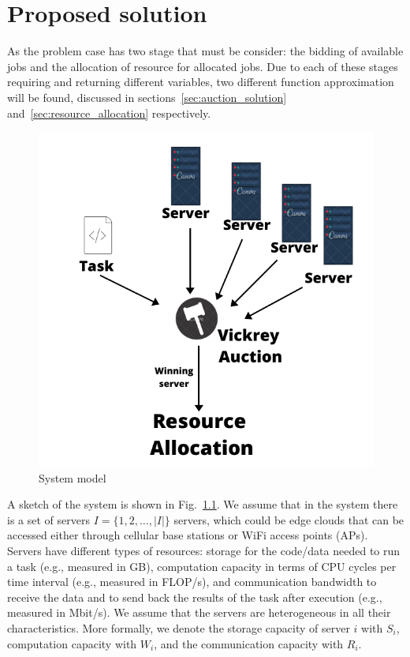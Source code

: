 \documentclass[sotoncolour]{uosproject}     %
\begin{document}
\chapter{Proposed solution}\label{ch:proposed_solution}
As the problem case has two stage that must be consider: the bidding of available jobs and the allocation of resource
for allocated jobs. Due to each of these stages requiring and returning different variables, two different function
approximation will be found, discussed in sections~\ref{sec:auction_solution} and~\ref{sec:resource_allocation}
respectively.

\begin{figure}
    \centering
    \includegraphics{extra/system_model.pdf}
    \caption{System model}
    \label{fig:system_model}
\end{figure}

A sketch of the system is shown in Fig.~\ref{fig:system_model}. 
We assume that in the system there is a set of servers $I = \{1,2,\ldots,\left|I\right|\}$ servers, which could be edge
clouds that can be accessed either through cellular base stations or WiFi access points (APs). Servers have different
types of resources: storage for the code/data needed to run a task (e.g., measured in GB), computation capacity in
terms of CPU cycles per time interval (e.g., measured in FLOP/s), and communication bandwidth to receive the data and
to send back the results of the task after execution (e.g., measured in Mbit/s). We assume that the servers are
heterogeneous in all their characteristics. More formally, we denote the storage capacity of server $i$ with $S_i$,
computation capacity with $W_i$, and the communication capacity with $R_i$.
\end{document}
